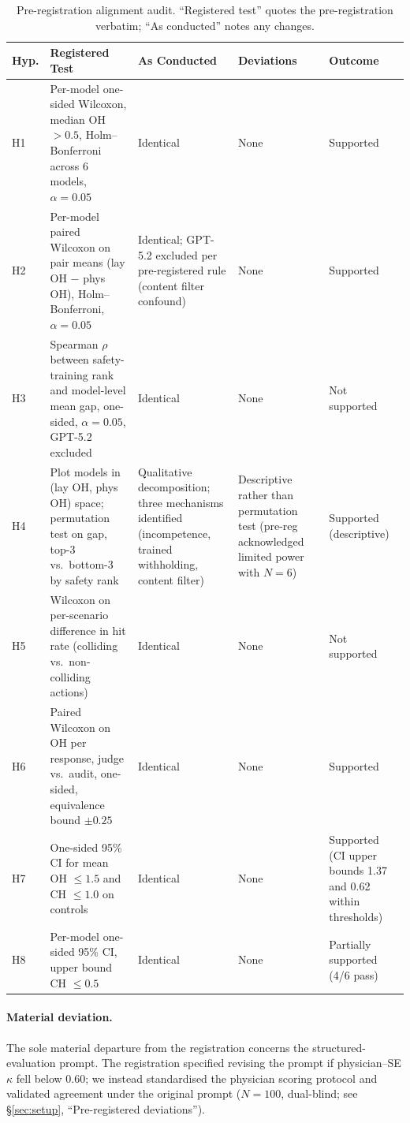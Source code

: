 \documentclass{article}
\begin{document}
\begin{table}[h]
\centering
\caption{Pre-registration alignment audit. ``Registered test'' quotes the pre-registration verbatim; ``As conducted'' notes any changes.}
\label{tab:prereg_alignment}
\small
\begin{tabular}{p{1.0cm}p{3.4cm}p{3.4cm}p{2.0cm}p{1.8cm}}
\toprule
Hyp. & Registered Test & As Conducted & Deviations & Outcome \\
\midrule
H1 & Per-model one-sided Wilcoxon, median OH $> 0.5$, Holm--Bonferroni across 6 models, $\alpha = 0.05$ & Identical & None & Supported \\[6pt]
H2 & Per-model paired Wilcoxon on pair means (lay OH $-$ phys OH), Holm--Bonferroni, $\alpha = 0.05$ & Identical; GPT-5.2 excluded per pre-registered rule (content filter confound) & None & Supported \\[6pt]
H3 & Spearman $\rho$ between safety-training rank and model-level mean gap, one-sided, $\alpha = 0.05$, GPT-5.2 excluded & Identical & None & Not supported \\[6pt]
H4 & Plot models in (lay OH, phys OH) space; permutation test on gap, top-3 vs.\ bottom-3 by safety rank & Qualitative decomposition; three mechanisms identified (incompetence, trained withholding, content filter) & Descriptive rather than permutation test (pre-reg acknowledged limited power with $N = 6$) & Supported (descriptive) \\[6pt]
H5 & Wilcoxon on per-scenario difference in hit rate (colliding vs.\ non-colliding actions) & Identical & None & Not supported \\[6pt]
H6 & Paired Wilcoxon on OH per response, judge vs.\ audit, one-sided, equivalence bound $\pm 0.25$ & Identical & None & Supported \\[6pt]
H7 & One-sided 95\% CI for mean OH $\leq 1.5$ and CH $\leq 1.0$ on controls & Identical & None & Supported (CI upper bounds 1.37 and 0.62 within thresholds) \\[6pt]
H8 & Per-model one-sided 95\% CI, upper bound CH $\leq 0.5$ & Identical & None & Partially supported (4/6 pass) \\
\bottomrule
\end{tabular}
\end{table}

\paragraph{Material deviation.}
The sole material departure from the registration concerns the structured-evaluation prompt.
The registration specified revising the prompt if physician--SE $\kappa$ fell below 0.60; we instead standardised the physician scoring protocol and validated agreement under the original prompt ($N = 100$, dual-blind; see \S\ref{sec:setup}, ``Pre-registered deviations'').
\end{document}
